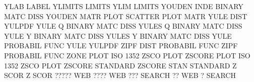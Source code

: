 YLAB                                    LABEL
YLIMITS                                 LIMITS
YLIM                                    LIMITS
YOUDEN   INDE                           BINARY   MATC DISS
YOUDEN   MATR PLOT                      SCATTER  PLOT MATR
YULE     DIST                           YULPDF
YULE     Q                              BINARY   MATC DISS
YULES    Q                              BINARY   MATC DISS
YULE     Y                              BINARY   MATC DISS
YULES    Y                              BINARY   MATC DISS
YULE                                    PROBABIL FUNC
YULE                                    YULPDF
ZIPF     DIST                           PROBABIL FUNC
ZIPF                                    PROBABIL FUNC
ZONE     PLOT                           ISO      1352 ZSCO PLOT
ZSCORE   PLOT                           ISO      1352 ZSCO PLOT
ZSCORE                                  STANDARD
ZSCORE   STAN                           STANDARD
Z        SCOR                           Z        SCOR
?????                                   WEB
????                                    WEB
???                                     SEARCH
??                                      WEB
?                                       SEARCH
